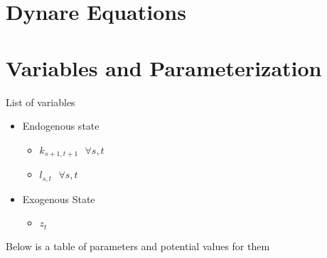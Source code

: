 \documentclass[paper=a4, fontsize=11pt]{scrartcl} %
\numberwithin{figure}{section} %
\numberwithin{table}{section} %
\begin{document}
\section{Dynare Equations}

\section{Variables and Parameterization}

List of variables

\begin{itemize}
	\item Endogenous state
	\begin{itemize}
		\item $k_{s+1, t+1} \text{ } \forall s, t$
		\item $l_{s, t} \text{ } \forall s, t$
	\end{itemize}
	\item Exogenous State
	\begin{itemize}
		\item $z_t$
	\end{itemize}
\end{itemize}

Below is a table of parameters and potential values for them
\end{document}
